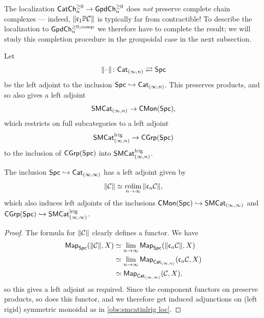 \documentclass[a4paper,11pt]{article}
\begin{document}
\begin{warning}
  The localization $\CChp_{n} \to \GpdChp_{n}$ does \emph{not}
  preserve complete chain complexes --- indeed, $\|\core\mP\nC\|$ is
  typically far from contractible! To describe the localization to
  $\GpdChpc_{n}$ we therefore have to complete the result; we will
  study this completion procedure in the groupoidal case in the next subsection.
\end{warning}

\begin{observation}\label{obs:smcatinlrig loc}
  Let
  \[ \|\blank\| \colon \CatIn \rightleftarrows \Spc \]
  be the left adjoint to the inclusion $\Spc \hookrightarrow
  \CatIn$. This preserves products, and so also gives a left adjoint
  \[ \SMCatIn \to \CMon(\Spc),\]
  which restricts on full subcategories to a left adjoint
  \[ \SMCatIn^{\lrig} \to \CGrp(\Spc)\]
  to the inclusion of $\CGrp(\Spc)$ into $\SMCatIn^{\lrig}$.
\end{observation}

\begin{propn}\label{lem:locn catii spc}
  The inclusion $\Spc \hookrightarrow \CatII$ has a left adjoint given
  by
  \[ \|\nC\| \simeq \colimP_{n\rightarrow \infty} \|\core[n] \nC\|,\]
  which also induces left adjoints of the inclusions $\CMon(\Spc)
  \hookrightarrow \SMCatII$ and $\CGrp(\Spc) \hookrightarrow \SMCatII^{\lrig}$.
\end{propn}
\begin{proof}
  The formula for $\|\nC\|$ clearly defines a functor. We have
  \[
    \begin{split}
      \Map_{\Spc}(\|\nC\|, X) & \simeq \limP_{n \rightarrow \infty} 
      \Map_{\Spc}(\|\core[n]\nC\|, X) \\ & \simeq \limP_{n \rightarrow \infty}
      \Map_{\CatIn}(\core[n]\nC, X) \\ & \simeq \Map_{\CatII}(\nC, X),
    \end{split}
  \]
  so this gives a left adjoint as required. Since the component
  functors on \incats{} preserve products, so does this functor, and
  we therefore get induced adjunctions on (left rigid) symmetric monoidal
  \iicats{} as in \cref{obs:smcatinlrig loc}.
\end{proof}
\end{document}

